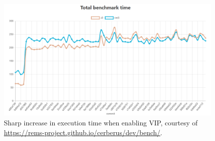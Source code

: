 \begin{figure}[h]
    \centering
    \includegraphics[width=\textwidth]{../misc/vip-performance-hit.png}
    \caption{Sharp increase in execution time when enabling VIP, courtesy of
        \url{https://rems-project.github.io/cerberus/dev/bench/}.}\label{fig:vip-performance-hit2}
\end{figure}

